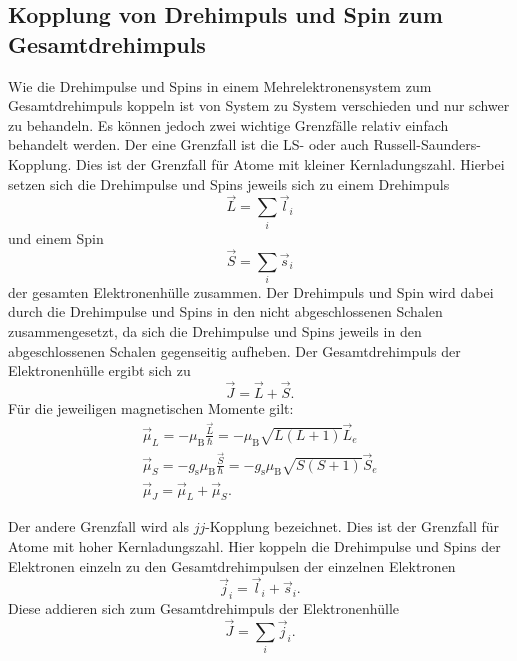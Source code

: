 \subsection{Kopplung von Drehimpuls und Spin zum Gesamtdrehimpuls}

Wie die Drehimpulse und Spins in einem Mehrelektronensystem zum Gesamtdrehimpuls koppeln ist von System zu System verschieden und nur schwer zu behandeln. Es können jedoch zwei wichtige Grenzfälle relativ einfach behandelt werden. Der eine Grenzfall ist die LS- oder auch Russell-Saunders-Kopplung. Dies ist der Grenzfall für Atome mit kleiner Kernladungszahl. Hierbei setzen sich die Drehimpulse und Spins jeweils sich zu einem Drehimpuls \[\vec{L}=\sum_i \vec{l}_i\] und einem Spin \[\vec{S}=\sum_i \vec{s}_i\] der gesamten Elektronenhülle zusammen. Der Drehimpuls und Spin wird dabei durch die Drehimpulse und Spins in den nicht abgeschlossenen Schalen zusammengesetzt, da sich die Drehimpulse und Spins jeweils in den abgeschlossenen Schalen gegenseitig aufheben. Der Gesamtdrehimpuls der Elektronenhülle ergibt sich zu \[\vec{J}=\vec{L}+\vec{S}.\] Für die jeweiligen magnetischen Momente gilt:
\begin{gather*}
	\vec{\mu}_L=-  \mu_\text{B} \frac{\vec{L}}{\hbar}=- \mu_\text{B} \sqrt{L(L+1)} \vec{L}_e\\
	\vec{\mu}_S=- g_\text{s} \mu_\text{B} \frac{\vec{S}}{\hbar}=- g_\text{s} \mu_\text{B} \sqrt{S(S+1)} \vec{S}_e\\
	\vec{\mu}_J=\vec{\mu}_L+\vec{\mu}_S.
\end{gather*}

Der andere Grenzfall wird als $jj$-Kopplung bezeichnet. Dies ist der Grenzfall für Atome mit hoher Kernladungszahl. Hier koppeln die Drehimpulse und Spins der Elektronen einzeln zu den Gesamtdrehimpulsen der einzelnen Elektronen \[\vec{j}_i=\vec{l}_i+\vec{s}_i.\] Diese addieren sich zum Gesamtdrehimpuls der Elektronenhülle \[\vec{J}=\sum_i \vec{j}_i .\]



